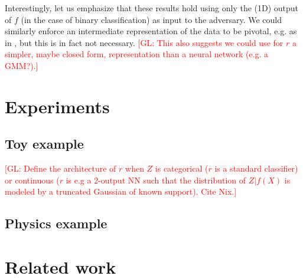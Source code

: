 \documentclass[twocolumn,superscriptaddress,aps]{revtex4-1}
\newcommand{\glnote}[1]{\textcolor{red}{[GL: #1]}}
\theoremstyle{plain}
\begin{document}
Interestingly, let us emphasize that these results hold using only the (1D) output
of $f$ (in the case of binary classification) as input to the adversary. We
could similarly enforce an intermediate representation of the data to be
pivotal, e.g. as in \citep{ganin2014unsupervised}, but this is in fact not
necessary. \glnote{This also suggests we could use for $r$ a simpler, maybe
closed form, representation than a neural network (e.g. a GMM?).}



\section{Experiments}

\subsection{Toy example}

\glnote{Define the architecture of $r$ when $Z$ is categorical ($r$ is a
standard classifier) or continuous ($r$ is e.g a 2-output NN such that the
distribution of $Z|f(X)$ is modeled by a truncated Gaussian of known support). Cite Nix.}

\subsection{Physics example}



\section{Related work}
\end{document}

